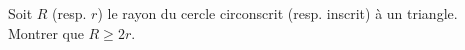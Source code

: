 Soit $R$ (resp. $r$) le rayon du cercle circonscrit (resp. inscrit) à un triangle. Montrer que $R \geq 2r$.
